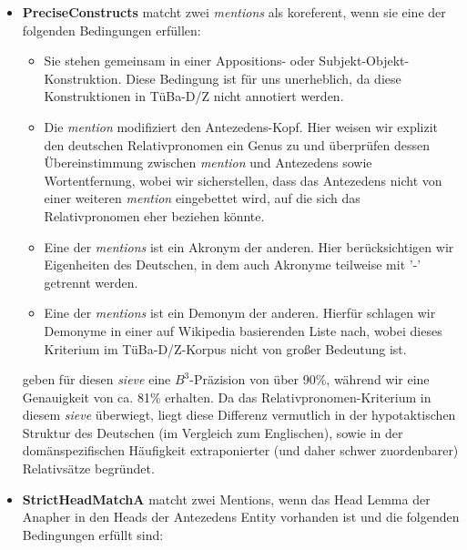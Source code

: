 \documentclass{scrartcl}
\begin{document}
\begin{itemize}
\item \textbf{PreciseConstructs} matcht zwei \textit{mentions} als koreferent, wenn sie eine der folgenden Bedingungen erfüllen: 
\begin{itemize}
	\item Sie stehen gemeinsam in einer Appositions- oder Subjekt-Objekt-Konstruktion. Diese Bedingung ist für uns unerheblich, da diese Konstruktionen in TüBa-D/Z nicht annotiert werden.
	\item Die \textit{mention} modifiziert den Antezedens-Kopf. Hier weisen wir explizit den deutschen Relativpronomen ein Genus zu und überprüfen dessen Übereinstimmung zwischen \textit{mention} und Antezedens sowie Wortentfernung, wobei wir sicherstellen, dass das Antezedens nicht von einer weiteren \textit{mention} eingebettet wird, auf die sich das Relativpronomen eher beziehen könnte.
	\item Eine der \textit{mentions} ist ein Akronym der anderen. Hier berücksichtigen wir Eigenheiten des Deutschen, in dem auch Akronyme teilweise mit '-' getrennt werden.
	\item Eine der \textit{mentions} ist ein Demonym der anderen. Hierfür schlagen wir Demonyme in einer auf Wikipedia basierenden Liste nach, wobei dieses Kriterium im TüBa-D/Z-Korpus nicht von großer Bedeutung ist.
\end{itemize}
 geben für diesen \textit{sieve} eine $B^3$-Präzision von über 90\%, während wir eine Genauigkeit von ca. 81\% erhalten. Da das Relativpronomen-Kriterium in diesem \textit{sieve} überwiegt, liegt diese Differenz vermutlich in der hypotaktischen Struktur des Deutschen (im Vergleich zum Englischen), sowie in der domänspezifischen Häufigkeit extraponierter (und daher schwer zuordenbarer) Relativsätze begründet.

\item \textbf{StrictHeadMatchA} matcht zwei Mentions, wenn das Head Lemma der Anapher in den Heads der Antezedens Entity vorhanden ist und die folgenden Bedingungen erfüllt sind:



\end{itemize}
\end{document}

